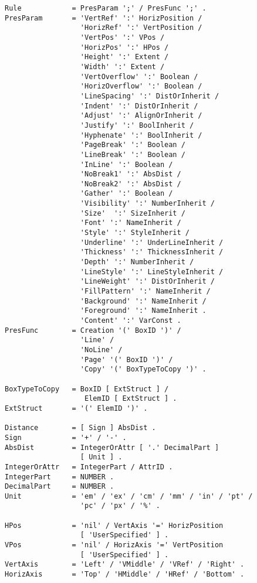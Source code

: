 \begin{verbatim}
Rule            = PresParam ';' / PresFunc ';' .
PresParam       = 'VertRef' ':' HorizPosition /
                  'HorizRef' ':' VertPosition /
                  'VertPos' ':' VPos /
                  'HorizPos' ':' HPos /
                  'Height' ':' Extent /
                  'Width' ':' Extent /
                  'VertOverflow' ':' Boolean /
                  'HorizOverflow' ':' Boolean /
                  'LineSpacing' ':' DistOrInherit /
                  'Indent' ':' DistOrInherit /
                  'Adjust' ':' AlignOrInherit /
                  'Justify' ':' BoolInherit /
                  'Hyphenate' ':' BoolInherit /
                  'PageBreak' ':' Boolean /
                  'LineBreak' ':' Boolean /
                  'InLine' ':' Boolean /
                  'NoBreak1' ':' AbsDist /
                  'NoBreak2' ':' AbsDist /
                  'Gather' ':' Boolean /
                  'Visibility' ':' NumberInherit /
                  'Size'  ':' SizeInherit /
                  'Font' ':' NameInherit /
                  'Style' ':' StyleInherit /
                  'Underline' ':' UnderLineInherit /
                  'Thickness' ':' ThicknessInherit /
                  'Depth' ':' NumberInherit /
                  'LineStyle' ':' LineStyleInherit /
                  'LineWeight' ':' DistOrInherit /
                  'FillPattern' ':' NameInherit /
                  'Background' ':' NameInherit /
                  'Foreground' ':' NameInherit .
                  'Content' ':' VarConst .
PresFunc        = Creation '(' BoxID ')' /
                  'Line' /
                  'NoLine' /
                  'Page' '(' BoxID ')' /
                  'Copy' '(' BoxTypeToCopy ')' .

BoxTypeToCopy   = BoxID [ ExtStruct ] /
                   ElemID [ ExtStruct ] .
ExtStruct       = '(' ElemID ')' .

Distance        = [ Sign ] AbsDist .
Sign            = '+' / '-' .
AbsDist         = IntegerOrAttr [ '.' DecimalPart ]
                  [ Unit ] .
IntegerOrAttr   = IntegerPart / AttrID .
IntegerPart     = NUMBER .
DecimalPart     = NUMBER .
Unit            = 'em' / 'ex' / 'cm' / 'mm' / 'in' / 'pt' /
                  'pc' / 'px' / '%' .

HPos            = 'nil' / VertAxis '=' HorizPosition 
                  [ 'UserSpecified' ] .
VPos            = 'nil' / HorizAxis '=' VertPosition 
                  [ 'UserSpecified' ] .
VertAxis        = 'Left' / 'VMiddle' / 'VRef' / 'Right' .
HorizAxis       = 'Top' / 'HMiddle' / 'HRef' / 'Bottom' .


\end{verbatim}
